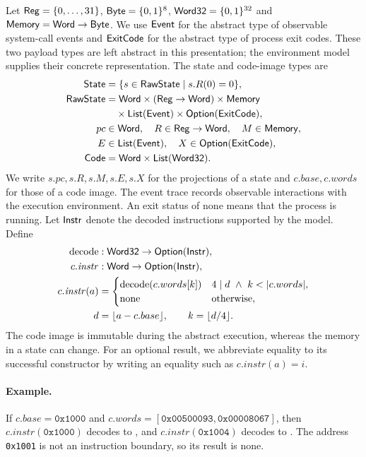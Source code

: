 \begin{definition}\label{def:state}
Let $\mathsf{Reg}=\{0,\ldots,31\}$, $\mathsf{Byte}=\{0,1\}^8$, $\mathsf{Word32}=\{0,1\}^{32}$ and $\mathsf{Memory}=\mathsf{Word}\to\mathsf{Byte}$. We use $\mathsf{Event}$ for the abstract type of observable system-call events and $\mathsf{ExitCode}$ for the abstract type of process exit codes. These two payload types are left abstract in this presentation; the environment model supplies their concrete representation. The state and code-image types are
\[
\begin{aligned}
\mathsf{State}&=\{s\in\mathsf{RawState}\mid s.R(0)=0\},\\
\mathsf{RawState}&=\mathsf{Word}\times(\mathsf{Reg}\to\mathsf{Word})\times\mathsf{Memory}\\ &\quad\times\mathsf{List}(\mathsf{Event})\times\mathsf{Option}(\mathsf{ExitCode}),\\
pc&\in\mathsf{Word},\quad R\in\mathsf{Reg}\to\mathsf{Word},\quad M\in\mathsf{Memory},\\
E&\in\mathsf{List}(\mathsf{Event}),\quad X\in\mathsf{Option}(\mathsf{ExitCode}),\\
\mathsf{Code}&=\mathsf{Word}\times\mathsf{List}(\mathsf{Word32}).
\end{aligned}
\]
We write $s.pc,s.R,s.M,s.E,s.X$ for the projections of a state and $c.base,c.words$ for those of a code image. The event trace records observable interactions with the execution environment. An exit status of $\mathrm{none}$ means that the process is running. Let $\mathsf{Instr}$ denote the decoded instructions supported by the model. Define
\[
\begin{aligned}
\mathrm{decode}&:\Ty{Word32}\to\Opt(\Ty{Instr}),\\
c.\mathit{instr}&:\W\to\Opt(\Ty{Instr}),\\
c.\mathit{instr}(a)&=
\begin{cases}
\mathrm{decode}(c.words[k]) & 4\mid d\ \land\ k<|c.words|,\\
\mathrm{none}&\text{otherwise},
\end{cases}\\
 d&=\un{a-c.base},\qquad k=\lfloor d/4\rfloor.
\end{aligned}
\]
The code image is immutable during the abstract execution, whereas the memory in a state can change. For an optional result, we abbreviate equality to its successful constructor by writing an equality such as $c.\mathit{instr}(a)=i$.
\end{definition}

\paragraph{Example.} If $c.base=\mathtt{0x1000}$ and $c.words=[\mathtt{0x00500093},\mathtt{0x00008067}]$, then $c.\mathit{instr}(\mathtt{0x1000})$ decodes to , and $c.\mathit{instr}(\mathtt{0x1004})$ decodes to . The address \texttt{0x1001} is not an instruction boundary, so its result is \textsf{none}.



